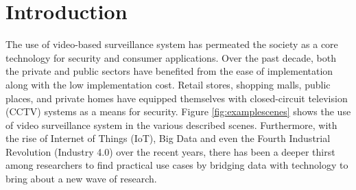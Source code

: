 \chapter{Introduction}
The use of video-based surveillance system has permeated the society as a core technology for security and consumer applications. Over the past decade, both the private and public sectors have benefited from the ease of implementation along with the low implementation cost.
Retail stores, shopping malls, public places, and private homes have equipped themselves with closed-circuit television (CCTV) systems as a means for security. Figure \ref{fig:examplescenes} shows the use of video surveillance system in the various described scenes.
Furthermore, with the rise of Internet of Things (IoT), Big Data and even the
Fourth Industrial Revolution (Industry 4.0) over the recent years, there has been a deeper thirst among researchers to find practical use cases by bridging %
data with technology to bring about a new wave of research.

